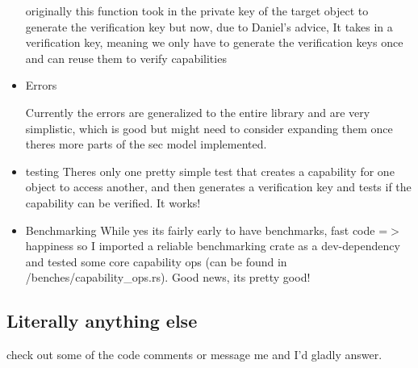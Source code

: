 \documentclass{article}
\begin{document}
\begin{itemize}
	      originally this function took in the private key of the target object to generate the
	      verification key but now, due to Daniel's advice, It takes in a verification
	      key, meaning we only have to generate the verification keys once and can reuse them
	      to verify capabilities
	\item Errors

	      Currently the errors are generalized to the entire library and are very
	      simplistic, which is good but might need to consider expanding them once
	      theres more parts of the sec model implemented.

	\item testing
	      Theres only one pretty simple test that creates a capability for one object to access another,
	      and then generates a verification key and tests if the capability can be verified. It works!

	\item Benchmarking
	      While yes its fairly early to have benchmarks, fast code =$>$ happiness so I imported
	      a reliable benchmarking crate as a dev-dependency and tested
	      some core capability ops (can be found in /benches/capability_ops.rs).
	      Good news, its pretty good!
\end{itemize}


\subsection{Literally anything else}
check out some of the code comments or message me and I'd gladly answer.
\end{document}

